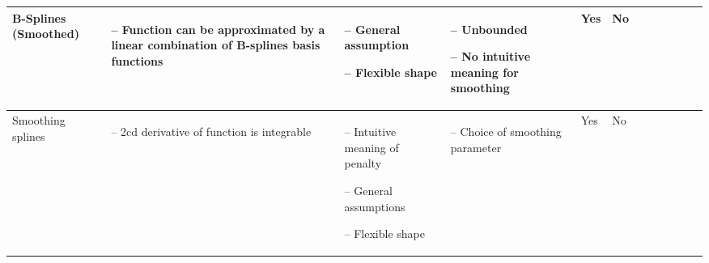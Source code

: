 \begin{table}[!ht]
\begin{tabular}{p{1.6cm}p{3.3cm}p{3.3cm}p{3.4cm}p{0.4cm}p{0.4cm}p{3cm}p{3cm}p{3cm}p{3cm}p{2.7cm}p{3cm}|}
		B-Splines (Smoothed)                                                                                                                                         &
		\begin{cptitemize} \item[--]  Function can be approximated by a linear combination of B-splines basis functions               \end{cptitemize}               &
		\begin{cptitemize} \item[--]  General assumption \item[--]  Flexible shape                                                            \end{cptitemize}        &
		\begin{cptitemize} \item[--]  Unbounded \item[--]  No intuitive meaning for smoothing                                                \end{cptitemize}        &
		Yes                                                                                                                                                            &
		No                                            \\ \hline%

		Smoothing splines                                                                                                                                            &
		\begin{cptitemize} \item[--]  2cd derivative of function is integrable                                                        \end{cptitemize}               &
		\begin{cptitemize} \item[--]  Intuitive meaning of penalty \item[--]  General assumptions \item[--]  Flexible shape                         \end{cptitemize} &
		\begin{cptitemize} \item[--]  Choice of smoothing parameter                                                                                       \end{cptitemize}               &
		Yes                                                                                                                                                          &
        No \\                                                                         


\end{tabular}
\end{table}
